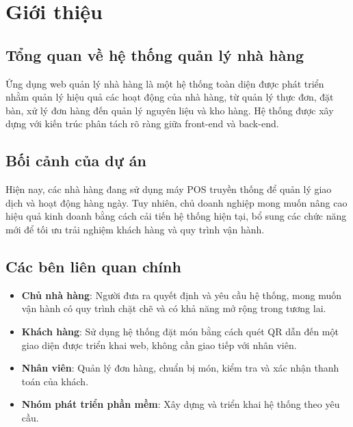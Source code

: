 \documentclass[a4paper]{article}
\begin{document}
\thispagestyle{empty}

\newpage
\tableofcontents
\newpage



\section{Giới thiệu}
\subsection{Tổng quan về hệ thống quản lý nhà hàng}

Ứng dụng web quản lý nhà hàng là một hệ thống toàn diện được phát triển nhằm quản lý hiệu quả các hoạt động của nhà hàng, từ quản lý thực đơn, đặt bàn, xử lý đơn hàng đến quản lý nguyên liệu và kho hàng. Hệ thống được xây dựng với kiến trúc phân tách rõ ràng giữa front-end và back-end.

\subsection{Bối cảnh của dự án}
Hiện nay, các nhà hàng đang sử dụng máy POS truyền thống để quản lý giao dịch và hoạt động hàng ngày. Tuy nhiên, chủ doanh nghiệp mong muốn nâng cao hiệu quả kinh doanh bằng cách cải tiến hệ thống hiện tại, bổ sung các chức năng mới để tối ưu trải nghiệm khách hàng và quy trình vận hành.

\subsection{Các bên liên quan chính}
\begin{itemize}
    \item \textbf{Chủ nhà hàng}: Người đưa ra quyết định và yêu cầu hệ thống, mong muốn vận hành có quy trình chặt chẽ và có khả năng mở rộng trong tương lai.
    \item \textbf{Khách hàng}: Sử dụng hệ thống đặt món bằng cách quét QR dẫn đến một giao diện được triển khai web, không cần giao tiếp với nhân viên.
    \item \textbf{Nhân viên}: Quản lý đơn hàng, chuẩn bị món, kiểm tra và xác nhận thanh toán của khách.
    \item \textbf{Nhóm phát triển phần mềm}: Xây dựng và triển khai hệ thống theo yêu cầu.
\end{itemize}
\end{document}
